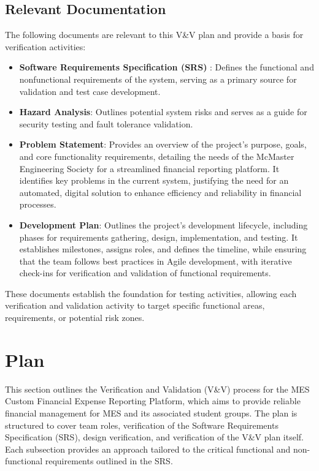 \documentclass[12pt, titlepage]{article}
\begin{document}
\subsection{Relevant Documentation}

The following documents are relevant to this V\&V plan and provide a basis for verification activities:

\begin{itemize}
    \item \textbf{Software Requirements Specification (SRS)} \citep{SRS}: Defines the functional and nonfunctional requirements of the system, serving as a primary source for validation and test case development.
    \item \textbf{Hazard Analysis}\citep{HazardAnalysis}: Outlines potential system risks and serves as a guide for security testing and fault tolerance validation.
    \item \textbf{Problem Statement}\citep{ProblemStatement}: Provides an overview of the project's purpose, goals, and core functionality requirements, detailing the needs of the McMaster Engineering Society for a streamlined financial reporting platform. It identifies key problems in the current system, justifying the need for an automated, digital solution to enhance efficiency and reliability in financial processes.
    \item \textbf{Development Plan}\citep{DevelopmentPlan}: Outlines the project's development lifecycle, including phases for requirements gathering, design, implementation, and testing. It establishes milestones, assigns roles, and defines the timeline, while ensuring that the team follows best practices in Agile development, with iterative check-ins for verification and validation of functional requirements.
\end{itemize}

These documents establish the foundation for testing activities, allowing each verification and validation activity to target specific functional areas, requirements, or potential risk zones.

\section{Plan}
This section outlines the Verification and Validation (V\&V) process for the MES Custom Financial Expense Reporting Platform, which aims to provide reliable financial management for MES and its associated student groups. The plan is structured to cover team roles, verification of the Software Requirements Specification (SRS), design verification, and verification of the V\&V plan itself. Each subsection provides an approach tailored to the critical functional and non-functional requirements outlined in the SRS.
\end{document}
